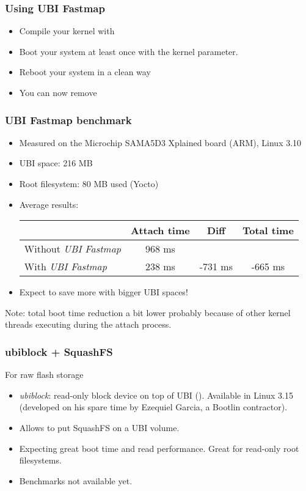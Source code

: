 \begin{frame}
\frametitle{Using UBI Fastmap}
\begin{itemize}
\item Compile your kernel with 
\item Boot your system at least once with the
       kernel parameter.
\item Reboot your system in a clean way
\item You can now remove 
\end{itemize}
\end{frame}

\begin{frame}
\frametitle{UBI Fastmap benchmark}
\begin{itemize}
\item Measured on the Microchip SAMA5D3 Xplained board (ARM), Linux 3.10
\item UBI space: 216 MB
\item Root filesystem: 80 MB used (Yocto)
\item Average results:
    \newline \newline
    \begin{tabular}{| l || c | c | c |}
    \hline
    & Attach time & Diff & Total time\\
    \hline
    Without {\em UBI Fastmap} & 968 ms & & \\
    With {\em UBI Fastmap} & 238 ms & -731 ms & -665 ms \\
    \hline
    \end{tabular}
    \newline
\item Expect to save more with bigger UBI spaces!
\end{itemize}
Note: total boot time reduction a bit lower probably
because of other kernel threads executing during the
attach process.
\end{frame}

\begin{frame}
\frametitle{ubiblock + SquashFS}
For raw flash storage
\begin{itemize}
\item {\em ubiblock}: read-only block device on top of UBI
      (). Available in Linux 3.15
      (developed on his spare time by Ezequiel Garcia,
      a Bootlin contractor).
\item Allows to put SquashFS on a UBI volume.
\item Expecting great boot time and read performance. Great
      for read-only root filesystems.
\item Benchmarks not available yet.
\end{itemize}
\end{frame}

